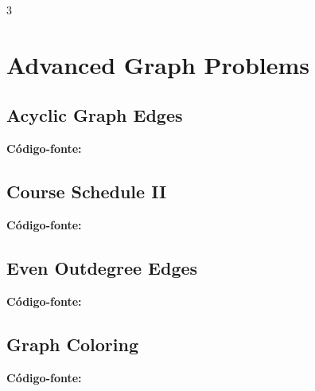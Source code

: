 \documentclass[8pt]{extarticle}
\begin{document}
\begin{multicols*}{3}

\section{Advanced Graph Problems}

\subsection{Acyclic Graph Edges}
\begin{caixaenunciado}

\end{caixaenunciado}
\vspace{0.3cm}
\noindent\textbf{Código-fonte:}


\subsection{Course Schedule II}
\begin{caixaenunciado}

\end{caixaenunciado}
\vspace{0.3cm}
\noindent\textbf{Código-fonte:}


\subsection{Even Outdegree Edges}
\begin{caixaenunciado}

\end{caixaenunciado}
\vspace{0.3cm}
\noindent\textbf{Código-fonte:}


\subsection{Graph Coloring}
\begin{caixaenunciado}

\end{caixaenunciado}
\vspace{0.3cm}
\noindent\textbf{Código-fonte:}



\end{multicols*}
\end{document}

